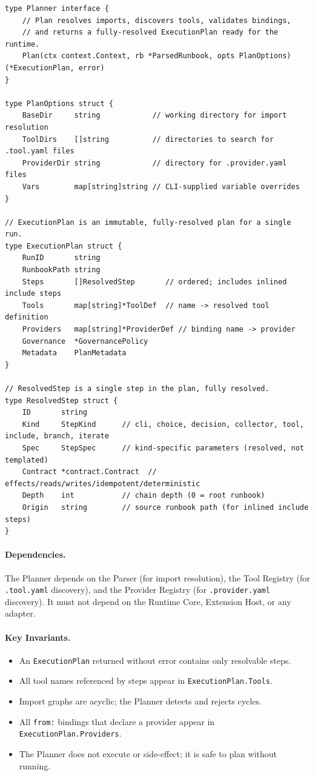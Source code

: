 \begin{verbatim}
type Planner interface {
    // Plan resolves imports, discovers tools, validates bindings,
    // and returns a fully-resolved ExecutionPlan ready for the runtime.
    Plan(ctx context.Context, rb *ParsedRunbook, opts PlanOptions) (*ExecutionPlan, error)
}

type PlanOptions struct {
    BaseDir     string            // working directory for import resolution
    ToolDirs    []string          // directories to search for .tool.yaml files
    ProviderDir string            // directory for .provider.yaml files
    Vars        map[string]string // CLI-supplied variable overrides
}

// ExecutionPlan is an immutable, fully-resolved plan for a single run.
type ExecutionPlan struct {
    RunID       string
    RunbookPath string
    Steps       []ResolvedStep       // ordered; includes inlined include steps
    Tools       map[string]*ToolDef  // name -> resolved tool definition
    Providers   map[string]*ProviderDef // binding name -> provider
    Governance  *GovernancePolicy
    Metadata    PlanMetadata
}

// ResolvedStep is a single step in the plan, fully resolved.
type ResolvedStep struct {
    ID       string
    Kind     StepKind      // cli, choice, decision, collector, tool, include, branch, iterate
    Spec     StepSpec      // kind-specific parameters (resolved, not templated)
    Contract *contract.Contract  // effects/reads/writes/idempotent/deterministic
    Depth    int           // chain depth (0 = root runbook)
    Origin   string        // source runbook path (for inlined include steps)
}
\end{verbatim}

\paragraph{Dependencies.}
The Planner depends on the Parser (for import resolution), the Tool Registry (for
\texttt{.tool.yaml} discovery), and the Provider Registry (for \texttt{.provider.yaml}
discovery). It must not depend on the Runtime Core, Extension Host, or any adapter.

\paragraph{Key Invariants.}
\begin{itemize}
  \item An \texttt{ExecutionPlan} returned without error contains only resolvable steps.
  \item All tool names referenced by steps appear in \texttt{ExecutionPlan.Tools}.
  \item Import graphs are acyclic; the Planner detects and rejects cycles.
  \item All \texttt{from:} bindings that declare a provider appear in \texttt{ExecutionPlan.Providers}.
  \item The Planner does not execute or side-effect; it is safe to plan without running.
\end{itemize}

